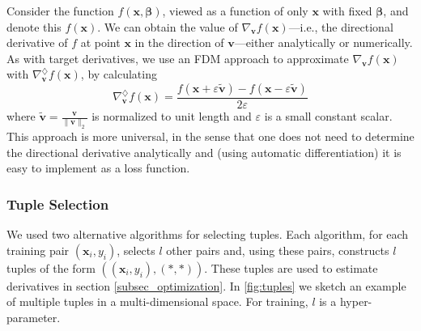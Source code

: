 \documentclass[conference]{IEEEtran}
\begin{document}
Consider the function $f(\mathbf{x},\boldsymbol{\beta})$, viewed as a function of only $\mathbf{x}$ with fixed $\boldsymbol{\beta}$, and denote this $f(\mathbf{x})$. 
We can obtain the value of $\nabla_{\mathbf{v}}f(\mathbf{x})$---i.e., the directional derivative of $f$ at point $\mathbf{x}$ in the direction of $\mathbf{v}$---either analytically or numerically. 
As with target derivatives, we use an FDM approach to approximate $\nabla_{\mathbf{v}}f(\mathbf{x})$ with $\nabla^{\diamondsuit}_{\mathbf{v}}f(\mathbf{x})$, by calculating%
\begin{equation} \nabla^{\diamondsuit}_{\mathbf{v}}f(\mathbf{x}) = \frac{ f(\mathbf{x}+\varepsilon\tilde{\mathbf{v}})-f(\mathbf{x}-\varepsilon\tilde{\mathbf{v}})}{2\varepsilon}
\end{equation} 
where $\tilde{\mathbf{v}} = \frac{\mathbf{v}}{\|\mathbf{v}\|_2}$ is normalized to unit length and $\varepsilon$ is a small constant scalar. %
This approach is more universal, in the sense that one does not need to determine the directional derivative analytically and (using automatic differentiation) it is easy to implement as a loss function. 

\subsubsection{Tuple Selection}

We used two alternative algorithms for selecting tuples. 
Each algorithm, for each training pair $(\mathbf{x}_i, y_i)$, selects $l$ other pairs and, using these pairs, constructs $l$ tuples of the form $((\mathbf{x}_i, y_i), (*, *))$. 
These tuples are used to estimate derivatives in section \ref{subsec_optimization}. %
In \autoref{fig:tuples} we sketch an example of multiple tuples in a multi-dimensional space. 
For training, $l$ is a hyper-parameter. 
\end{document}
